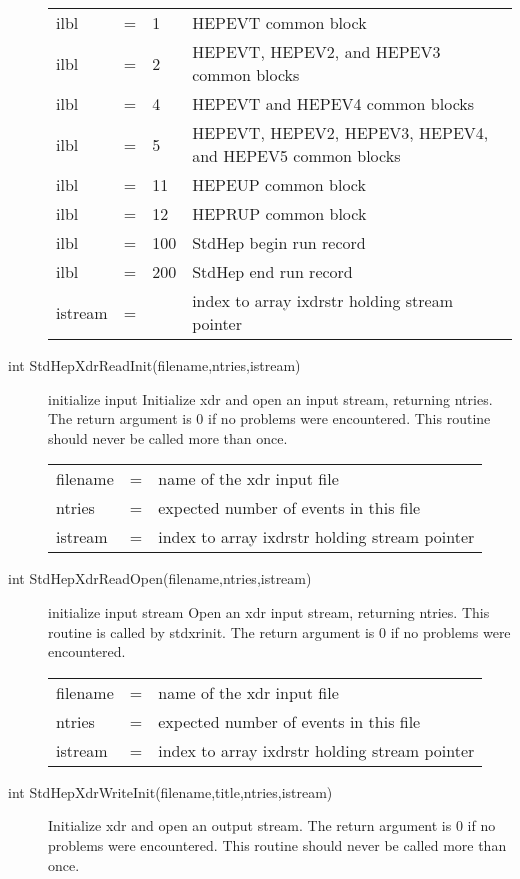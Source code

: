 \begin{description}
\begin{tabular}{lcll}
ilbl & = & 1   & HEPEVT common block \\
ilbl & = & 2   & HEPEVT, HEPEV2, and HEPEV3 common blocks \\
ilbl & = & 4   & HEPEVT and HEPEV4 common blocks \\
ilbl & = & 5   & HEPEVT, HEPEV2, HEPEV3, HEPEV4, and HEPEV5 common blocks \\
ilbl & = & 11  & HEPEUP common block \\
ilbl & = & 12  & HEPRUP common block \\
ilbl & = & 100 & StdHep begin run record \\
ilbl & = & 200 & StdHep end run record \\
istream & = &  & index to array ixdrstr holding stream pointer \\
\end{tabular}

\item[int StdHepXdrReadInit(filename,ntries,istream)] initialize input 
 Initialize xdr and open an input stream, returning ntries.
 The return argument is 0 if no problems were encountered.
 This routine should never be called more than once.

\begin{tabular}{lcl}
filename & = & name of the xdr input file \\
ntries & = & expected number of events in this file \\
istream & = & index to array ixdrstr holding stream pointer \\
\end{tabular}

\item[int StdHepXdrReadOpen(filename,ntries,istream)] initialize input stream 
 Open an xdr input stream, returning ntries.
 This routine is called by stdxrinit.
 The return argument is 0 if no problems were encountered.

\begin{tabular}{lcl}
filename & = & name of the xdr input file \\
ntries & = & expected number of events in this file \\
istream & = & index to array ixdrstr holding stream pointer \\
\end{tabular}

\item[int StdHepXdrWriteInit(filename,title,ntries,istream)]
 Initialize xdr and open an output stream.
 The return argument is 0 if no problems were encountered.
 This routine should never be called more than once.


\end{description}
